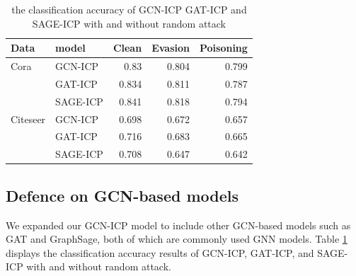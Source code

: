 \documentclass[conference]{IEEEtran}
\begin{document}

\begin{table}[htbp]
  \centering
  \caption{the classification accuracy of GCN-ICP GAT-ICP and SAGE-ICP with and without random attack}
    \begin{tabular}{|r|l|rrr|}
    \hline
    \multicolumn{1}{|l|}{Data} & model & \multicolumn{1}{l}{Clean} & \multicolumn{1}{l}{Evasion} & \multicolumn{1}{l|}{Poisoning} \\
    \hline
    \multicolumn{1}{|l|}{Cora} & GCN-ICP & 0.83  & 0.804 & 0.799 \\
          & GAT-ICP & 0.834 & 0.811 & 0.787 \\
          & SAGE-ICP & 0.841 & 0.818 & 0.794 \\
    \hline
    \multicolumn{1}{|l|}{Citeseer} & GCN-ICP & 0.698 & 0.672 & 0.657 \\
          & GAT-ICP & 0.716 & 0.683 & 0.665 \\
          & SAGE-ICP & 0.708 & 0.647 & 0.642\\
    \hline
    \end{tabular}%
  \label{tab:gcn-baesed}%
\end{table}%


\subsection{Defence on GCN-based models}

We expanded our GCN-ICP model to include other GCN-based models such as GAT and GraphSage, both of which are commonly used GNN models. Table \ref{tab:gcn-baesed} displays the classification accuracy results of GCN-ICP, GAT-ICP, and SAGE-ICP with and without random attack.
\end{document}
